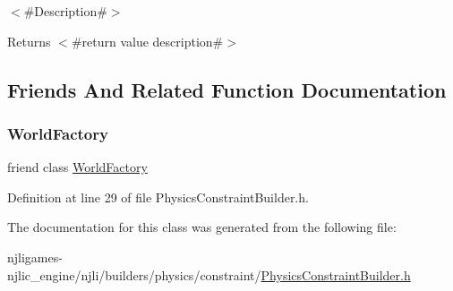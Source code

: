 $<$\#\+Description\#$>$

\begin{DoxyReturn}{Returns}
$<$\#return value description\#$>$ 
\end{DoxyReturn}


\subsection{Friends And Related Function Documentation}
\mbox{\label{classnjli_1_1_physics_constraint_builder_acb96ebb09abe8f2a37a915a842babfac}} 
\subsubsection{\texorpdfstring{World\+Factory}{WorldFactory}}
{\footnotesize\ttfamily friend class \mbox{\hyperlink{classnjli_1_1_world_factory}{World\+Factory}}\hspace{0.3cm}{\ttfamily [friend]}}



Definition at line 29 of file Physics\+Constraint\+Builder.\+h.



The documentation for this class was generated from the following file\+:\begin{DoxyCompactItemize}
\item 
njligames-\/njlic\+\_\+engine/njli/builders/physics/constraint/\mbox{\hyperlink{_physics_constraint_builder_8h}{Physics\+Constraint\+Builder.\+h}}\end{DoxyCompactItemize}
